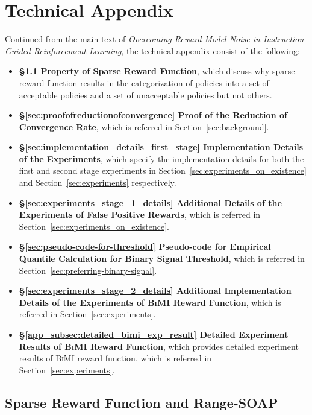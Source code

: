 \documentclass{article}
\theoremstyle{plain}
\theoremstyle{definition}
\theoremstyle{remark}
\begin{document}
\section{Technical Appendix}
Continued from the main text of \emph{Overcoming Reward Model Noise in Instruction-Guided Reinforcement Learning}, the technical appendix consist of the following: 
\begin{itemize}
    \item \textbf{\S \ref{app_subsec:property_of_sparse_reward} Property of Sparse Reward Function}, which discuss why sparse reward function results in the categorization of policies into a set of acceptable policies and a set of unacceptable policies but not others.
    \item \textbf{\S \ref{sec:proofofreductionofconvergence} Proof of the Reduction of Convergence Rate}, which is referred in Section~\ref{sec:background}.
    \item \textbf{\S \ref{sec:implementation_details_first_stage} Implementation Details of the Experiments}, which specify the implementation details for both the first and second stage experiments in Section~\ref{sec:experiments_on_existence} and Section~\ref{sec:experiments} respectively.
    \item \textbf{\S \ref{sec:experiments_stage_1_details} Additional Details of the Experiments of False Positive Rewards}, which is referred in Section~\ref{sec:experiments_on_existence}.
    \item \textbf{\S \ref{sec:pseudo-code-for-threshold} Pseudo-code for Empirical Quantile Calculation for Binary Signal Threshold}, which is referred in Section~\ref{sec:preferring-binary-signal}.
    \item \textbf{\S \ref{sec:experiments_stage_2_details} Additional Implementation Details of the Experiments of \textsc{BiMI} Reward Function}, which is referred in Section~\ref{sec:experiments}.
    \item \textbf{\S \ref{app_subsec:detailed_bimi_exp_result} Detailed Experiment Results of \textsc{BiMI} Reward Function}, which provides detailed experiment results of \textsc{BiMI} reward function, which is referred in Section~\ref{sec:experiments}.
\end{itemize}

\subsection{Sparse Reward Function and Range-SOAP}
\label{app_subsec:property_of_sparse_reward}
\end{document}
